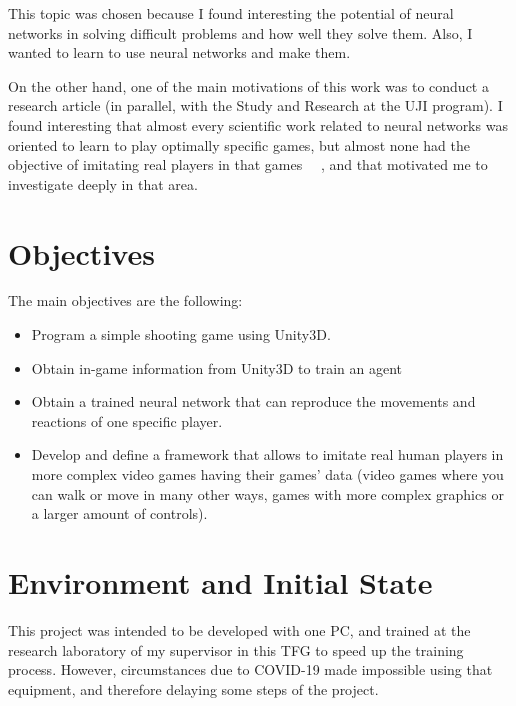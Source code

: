 This topic was chosen because I found interesting the potential of neural networks in solving difficult problems and how well they solve them. Also, I wanted to learn to use neural networks and make them.

On the other hand, one of the main motivations of this work was to conduct a research article (in parallel, with the Study and Research at the UJI program). I found interesting that almost every scientific work related to neural networks was oriented to learn to play optimally specific games, but almost none had the objective of imitating real players in that games ~\cite{livingstone}~\cite{nakano}, and that motivated me to investigate deeply in that area.

\section{Objectives}

The main objectives are the following:
\begin{itemize}
 \item Program a simple shooting game using Unity3D.
 \item Obtain in-game information from Unity3D to train an agent
 \item Obtain a trained neural network that can reproduce the movements and reactions of one specific player.
 \item Develop and define a framework that allows to imitate real human players in more complex video games having their games’ data (video games where you can walk or move in many other ways, games with more complex graphics or a larger amount of controls).
\end{itemize}

\section{Environment and Initial State}
\label{sec:initialstate}

This project was intended to be developed with one PC, and trained at the research laboratory of my supervisor in this TFG to speed up the training process. However, circumstances due to COVID-19 made impossible using that equipment, and therefore delaying some steps of the project.
